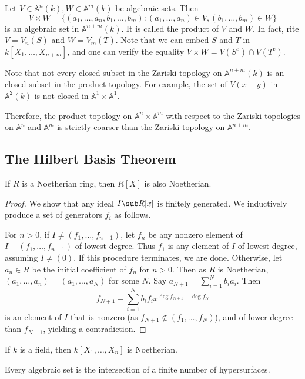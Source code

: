 \begin{remark}
Let $V\in\mathbb{A}^n(k),W\in\mathbb{A}^m(k)$ be algebraic sets. Then
\[V\times W=\{(a_1,\dots,a_n,b_1,\dots,b_m):(a_1,\dots,a_n)\in V,(b_1,\dots,b_m)\in W\}\]
is an algebraic set in $\mathbb{A}^{n+m}(k)$. It is called the product of $V$ and $W$. In fact, rite $V=V_n(S)$ and $W=V_m(T)$. Note that we can embed $S$ and $T$ in $k[X_1,\dots,X_{n+m}]$, and one can verify the equality $V\times W=V(S^e)\cap V(T^e)$.\par
Note that not every closed subset in the Zariski topology on $\mathbb{A}^{n+m}(k)$ is an closed subset in the product topology. For example, the set of $V(x-y)$ in $\mathbb{A}^2(k)$ is not closed in $\mathbb{A}^1\times\mathbb{A}^1$.\par
Therefore, the product topology on $\mathbb{A}^n\times\mathbb{A}^m$ with respect to the Zariski topologies on $\mathbb{A}^n$ and $\mathbb{A}^m$ is strictly coarser than the Zariski topology on $\mathbb{A}^{n+m}$.
\end{remark}
\subsection{The Hilbert Basis Theorem}
\begin{theorem}
If $R$ is a Noetherian ring, then $R[X]$ is also Noetherian.
\end{theorem}
\begin{proof}
We show that any ideal $I\sub R[x]$ is finitely generated. We inductively produce a set of generators $f_i$ as follows.\par
For $n>0$, if $I\neq(f_1,\dots,f_{n-1})$, let $f_n$ be any nonzero element of $I-(f_1,\dots,f_{n-1})$ of lowest degree. Thus $f_1$ is any element of $I$ of lowest degree, assuming $I\neq(0)$. If this procedure terminates, we are done. Otherwise, let $a_n\in R$ be the initial coefficient of $f_n$ for $n>0$. Then as $R$ is Noetherian, $(a_1,\dots,a_n)=(a_1,\dots,a_N)$ for some $N$. Say $a_{N+1}=\sum_{i=1}^{N}b_ia_i$. Then
\[f_{N+1}-\sum_{i=1}^{N}b_if_ix^{\deg f_{N+1}-\deg f_N}\]
is an element of $I$ that is nonzero (as $f_{N+1}\notin(f_1,\dots,f_N)$), and of lower degree than $f_{N+1}$, yielding a contradiction.
\end{proof}
\begin{corollary}
If $k$ is a field, then $k[X_1,\dots,X_n]$ is Noetherian.
\end{corollary}
\begin{corollary}
Every algebraic set is the intersection of a finite number of hypersurfaces.
\end{corollary}
